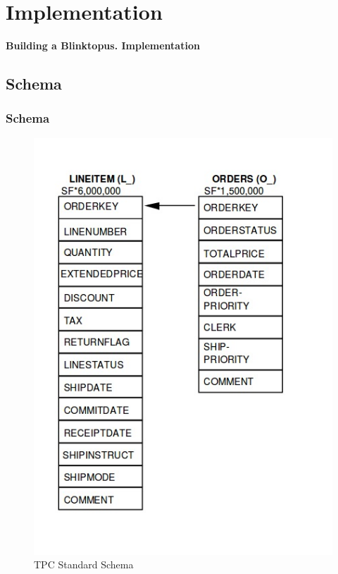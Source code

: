 \documentclass{beamer}
\begin{document}
\section{Implementation}

\begin{frame}
\hspace{0.2 cm} \textbf{\fontsize{14}{12}\selectfont Building a Blinktopus. Implementation}
\end{frame}

\subsection{Schema}
\begin{frame}
\frametitle{Schema}
\begin{figure}
  \centering
  \includegraphics[scale=0.33]{img/Blinktopus-Schema.jpg}
  \caption{TPC Standard Schema}
\end{figure}
\end{frame}
\end{document}
